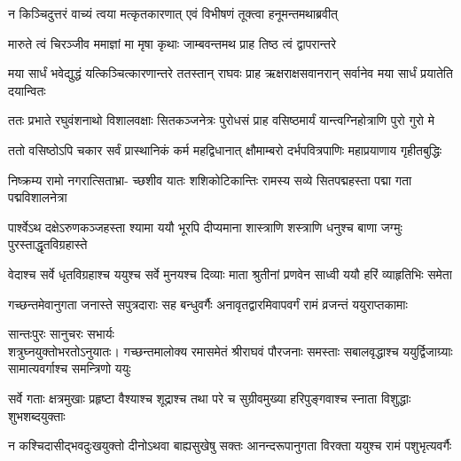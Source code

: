 \twolineshloka
{न किञ्चिदुत्तरं वाच्यं त्वया मत्कृतकारणात्}
{एवं विभीषणं तूक्त्वा हनूमन्तमथाब्रवीत्} %

\twolineshloka
{मारुते त्वं चिरञ्जीव ममाज्ञां मा मृषा कृथाः}
{जाम्बवन्तमथ प्राह तिष्ठ त्वं द्वापरान्तरे} %

\threelineshloka
{मया सार्धं भवेद्युद्धं यत्किञ्चित्कारणान्तरे}
{ततस्तान् राघवः प्राह ऋक्षराक्षसवानरान्}
{सर्वानेव मया सार्धं प्रयातेति दयान्वितः} %

\fourlineindentedshloka
{ततः प्रभाते रघुवंशनाथो}
{विशालवक्षाः सितकञ्जनेत्रः}
{पुरोधसं प्राह वसिष्ठमार्यं}
{यान्त्वग्निहोत्राणि पुरो गुरो मे} %

\fourlineindentedshloka
{ततो वसिष्ठोऽपि चकार सर्वं}
{प्रास्थानिकं कर्म महद्विधानात्}
{क्षौमाम्बरो दर्भपवित्रपाणिः}
{महाप्रयाणाय गृहीतबुद्धिः} %

\fourlineindentedshloka
{निष्क्रम्य रामो नगरात्सिताभ्रा-}
{च्छशीव यातः शशिकोटिकान्तिः}
{रामस्य सव्ये सितपद्महस्ता}
{पद्मा गता पद्मविशालनेत्रा} %

\fourlineindentedshloka
{पार्श्वेऽथ दक्षेऽरुणकञ्जहस्ता}
{श्यामा ययौ भूरपि दीप्यमाना}
{शास्त्राणि शस्त्राणि धनुश्च बाणा}
{जग्मुः पुरस्ताद्धृतविग्रहास्ते} %

\fourlineindentedshloka
{वेदाश्च सर्वे धृतविग्रहाश्च}
{ययुश्च सर्वे मुनयश्च दिव्याः}
{माता श्रुतीनां प्रणवेन साध्वी}
{ययौ हरिं व्याहृतिभिः समेता} %

\fourlineindentedshloka
{गच्छन्तमेवानुगता जनास्ते}
{सपुत्रदाराः सह बन्धुवर्गैः}
{अनावृतद्वारमिवापवर्गं}
{रामं व्रजन्तं ययुराप्तकामाः}%

\begin{minipage}{\linewidth}
\centering
{\hspace{-9ex}सान्तःपुरः\hspace{0.5ex} सानुचरः \hspace{0.5ex}सभार्यः}\\
{\hspace{-1ex}शत्रुघ्नयुक्तो\hspace{3ex}भरतोऽनुयातः।}
\fourlineindentedshloka
{गच्छन्तमालोक्य रमासमेतं}
{श्रीराघवं पौरजनाः समस्ताः}
{सबालवृद्धाश्च ययुर्द्विजाग्र्याः}
{सामात्यवर्गाश्च समन्त्रिणो ययुः} %
\end{minipage}

\fourlineindentedshloka
{सर्वे गताः क्षत्रमुखाः प्रहृष्टा}
{वैश्याश्च शूद्राश्च तथा परे च}
{सुग्रीवमुख्या हरिपुङ्गवाश्च}
{स्नाता विशुद्धाः शुभशब्दयुक्ताः} %

\fourlineindentedshloka
{न कश्चिदासीद्भवदुःखयुक्तो}
{दीनोऽथवा बाह्यसुखेषु सक्तः}
{आनन्दरूपानुगता विरक्ता}
{ययुश्च रामं पशुभृत्यवर्गैः} %

